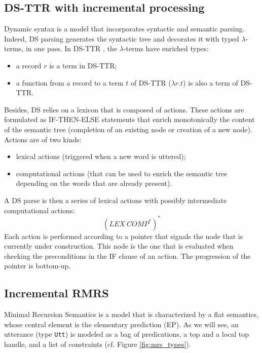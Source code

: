 \documentclass[11pt]{article}
\begin{document}
		\subsection{DS-TTR with incremental processing} \label{DS_TTR}
			Dynamic syntax \cite{kempson2001} is a model that incorporates syntactic and semantic parsing. Indeed, DS parsing generates the syntactic tree and decorates it with typed $\lambda$-terms, in one pass. In DS-TTR \cite{hough2011,hough2015}, the $\lambda$-terms have enriched types:
			\begin{itemize}
				\item a record $r$ is a term in DS-TTR;\vspace{-2mm}
				\item a function from a record to a term $t$ of DS-TTR ($\lambda r. t$) is also a term of DS-TTR.
			\end{itemize}
			Besides, DS relies on a lexicon that is composed of actions. These actions are formulated as IF-THEN-ELSE statements that enrich monotonically the content of the semantic tree (completion of an existing node or creation of a new node). Actions are of two kinds:
			\begin{itemize}
				\item lexical actions (triggered when a new word is uttered); \vspace{-2mm}
				\item computational actions (that can be used to enrich the semantic tree depending on the words that are already present).
			\end{itemize}
			A DS parse is then a series of lexical actions with possibly intermediate computational actions:
			\begin{equation*}
				(LEX \ COMP^*)^* 
			\end{equation*}
			Each action is performed according to a pointer that signals the node that is currently under construction. This node is the one that is evaluated when checking the preconditions in the IF clause of an action. The progression of the pointer is bottom-up.

		\subsection{Incremental RMRS}\label{RMRS}
			Minimal Recursion Semantics \cite{copestake2005} is a model that is characterized by a flat semantics, whose central element is the elementary prediction (EP). As we will see, an utterance (type \texttt{Utt}) is modeled as a bag of predications, a top and a local top handle, and a list of constraints (cf. Figure \ref{fig:mrs_types}).
\end{document}
